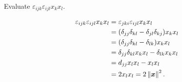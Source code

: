
\setcounter{question}{32}
\question Evaluate $\varepsilon_{ijk} \varepsilon_{ijl} x_k x_l$.
\begin{solution}
    \begin{align*}
        \varepsilon_{ijk}\varepsilon_{ijl} x_k x_l
        &= \varepsilon_{jki} \varepsilon_{ijl} x_k x_l \\
        &= (\delta_{jj} \delta_{kl} - \delta_{jl} \delta_{kj}) x_k x_l \\
        &= (\delta_{jj} \delta_{kl} - \delta_{lk}) x_k x_l \\
        &= \delta_{jj} \delta_{kl} x_k x_l - \delta_{lk} x_k x_l \\
        &= d_{jj} x_l x_l - x_l x_l \\
        &= 2 x_l x_l = 2 \left\lVert\bm x\right\rVert^2.
    \end{align*}
\end{solution}

